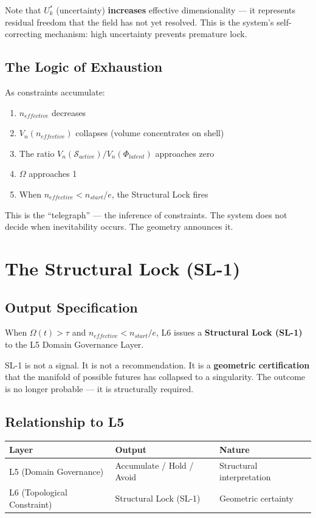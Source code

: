 \documentclass[11pt, a4paper]{article}
\begin{document}
Note that $U^*_k$ (uncertainty) \textbf{increases} effective dimensionality
--- it represents residual freedom that the field has not yet resolved.
This is the system's self-correcting mechanism: high uncertainty prevents
premature lock.

\subsection{The Logic of Exhaustion}

As constraints accumulate:
\begin{enumerate}[nosep]
  \item $n_{effective}$ decreases
  \item $V_n(n_{effective})$ collapses (volume concentrates on shell)
  \item The ratio $V_n(\mathcal{S}_{active}) / V_n(\Phi_{latent})$ approaches zero
  \item $\Omega$ approaches 1
  \item When $n_{effective} < n_{start}/e$, the Structural Lock fires
\end{enumerate}

This is the ``telegraph'' --- the inference of constraints. The system
does not decide when inevitability occurs. The geometry announces it.

\section{The Structural Lock (SL-1)}

\subsection{Output Specification}

When $\Omega(t) > \tau$ and $n_{effective} < n_{start}/e$, L6 issues a
\textbf{Structural Lock (SL-1)} to the L5 Domain Governance Layer.

SL-1 is not a signal. It is not a recommendation. It is a \textbf{geometric
certification} that the manifold of possible futures has collapsed to a
singularity. The outcome is no longer probable --- it is structurally
required.

\subsection{Relationship to L5}

\begin{center}
\begin{tabular}{@{}lll@{}}
\toprule
\textbf{Layer} & \textbf{Output} & \textbf{Nature} \\
\midrule
L5 (Domain Governance) & Accumulate / Hold / Avoid & Structural interpretation \\
L6 (Topological Constraint) & Structural Lock (SL-1) & Geometric certainty \\
\bottomrule
\end{tabular}
\end{center}
\end{document}
